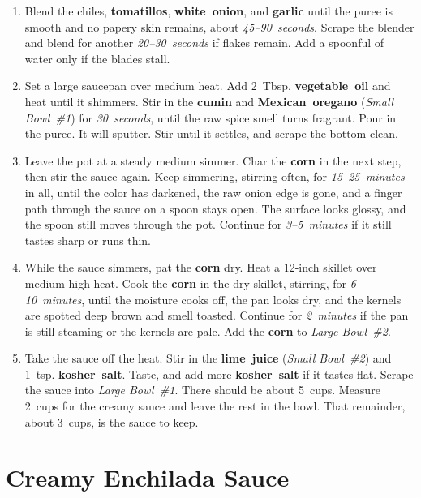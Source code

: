\documentclass[11pt,letterpaper]{article}
\begin{document}
\begin{enumerate}
    \item Blend the chiles, \textbf{tomatillos}, \textbf{white~onion}, and \textbf{garlic} until the puree is smooth and no papery skin remains, about \textit{45--90~seconds}. Scrape the blender and blend for another \textit{20--30~seconds} if flakes remain. Add a spoonful of water only if the blades stall.

    \item Set a large saucepan over medium heat. Add 2~Tbsp. \textbf{vegetable~oil} and heat until it shimmers. Stir in the \textbf{cumin} and \textbf{Mexican~oregano} (\textit{Small Bowl~\#1}) for \textit{30~seconds}, until the raw spice smell turns fragrant. Pour in the puree. It will sputter. Stir until it settles, and scrape the bottom clean.

    \item Leave the pot at a steady medium simmer. Char the \textbf{corn} in the next step, then stir the sauce again. Keep simmering, stirring often, for \textit{15--25~minutes} in all, until the color has darkened, the raw onion edge is gone, and a finger path through the sauce on a spoon stays open. The surface looks glossy, and the spoon still moves through the pot. Continue for \textit{3--5~minutes} if it still tastes sharp or runs thin.

    \item While the sauce simmers, pat the \textbf{corn} dry. Heat a 12-inch skillet over medium-high heat. Cook the \textbf{corn} in the dry skillet, stirring, for \textit{6--10~minutes}, until the moisture cooks off, the pan looks dry, and the kernels are spotted deep brown and smell toasted. Continue for \textit{2~minutes} if the pan is still steaming or the kernels are pale. Add the \textbf{corn} to \textit{Large Bowl~\#2}.

    \item Take the sauce off the heat. Stir in the \textbf{lime~juice} (\textit{Small Bowl~\#2}) and 1~tsp. \textbf{kosher~salt}. Taste, and add more \textbf{kosher~salt} if it tastes flat. Scrape the sauce into \textit{Large Bowl~\#1}. There should be about 5~cups. Measure 2~cups for the creamy sauce and leave the rest in the bowl. That remainder, about 3~cups, is the sauce to keep.
\end{enumerate}

\filbreak
\section*{Creamy Enchilada Sauce}
\end{document}

